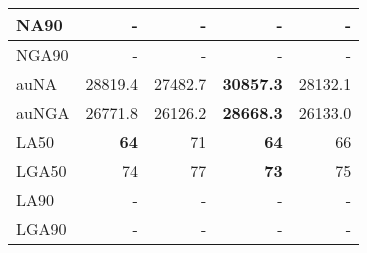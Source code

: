 \documentclass[12pt,a4paper]{article}
\begin{document}
\begin{table}[ht]
\begin{center}
\begin{tabular}{|l*{4}{|r}|}
NA90 & - & - & - & - \\ \hline
NGA90 & - & - & - & - \\ \hline
auNA & 28819.4 & 27482.7 & {\bf 30857.3} & 28132.1 \\ \hline
auNGA & 26771.8 & 26126.2 & {\bf 28668.3} & 26133.0 \\ \hline
LA50 & {\bf 64} & 71 & {\bf 64} & 66 \\ \hline
LGA50 & 74 & 77 & {\bf 73} & 75 \\ \hline
LA90 & - & - & - & - \\ \hline
LGA90 & - & - & - & - \\ \hline
\end{tabular}
\end{center}
\end{table}
\end{document}
